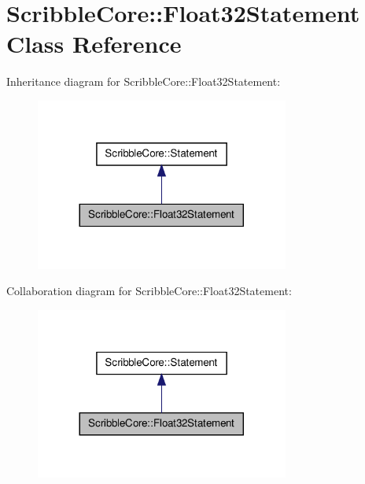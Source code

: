 \hypertarget{class_scribble_core_1_1_float32_statement}{\section{Scribble\-Core\-:\-:Float32\-Statement Class Reference}
\label{class_scribble_core_1_1_float32_statement}
}


Inheritance diagram for Scribble\-Core\-:\-:Float32\-Statement\-:\nopagebreak
\begin{figure}[H]
\begin{center}
\leavevmode
\includegraphics[width=236pt]{class_scribble_core_1_1_float32_statement__inherit__graph}
\end{center}
\end{figure}


Collaboration diagram for Scribble\-Core\-:\-:Float32\-Statement\-:\nopagebreak
\begin{figure}[H]
\begin{center}
\leavevmode
\includegraphics[width=236pt]{class_scribble_core_1_1_float32_statement__coll__graph}
\end{center}
\end{figure}
